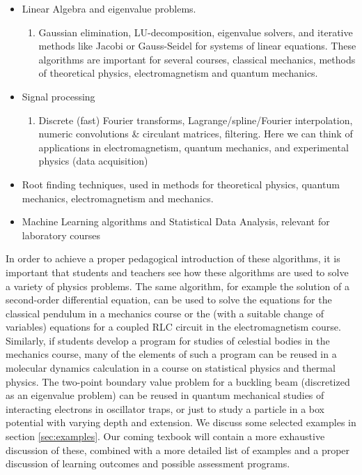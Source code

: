 \documentclass[graybox,envcountchap,sectrefs]{svmult}
\begin{document}
\begin{itemize}
\item Linear Algebra and eigenvalue problems.
\begin{enumerate}

  \item Gaussian elimination, LU-decomposition, eigenvalue solvers, and iterative methods like  Jacobi or Gauss-Seidel for systems of linear equations. These algorithms are important for several courses, classical mechanics, methods of theoretical physics, electromagnetism and quantum mechanics.

\end{enumerate}


\item Signal processing
\begin{enumerate}

  \item Discrete (fast) Fourier transforms, Lagrange/spline/Fourier interpolation, numeric convolutions {\&} circulant matrices, filtering. Here we can think of applications in electromagnetism, quantum mechanics, and experimental physics (data acquisition)

\end{enumerate}


\item Root finding techniques, used in methods for theoretical physics, quantum mechanics, electromagnetism and mechanics.

\item Machine Learning algorithms and Statistical Data Analysis, relevant for laboratory courses
\end{itemize}


In order to achieve a proper pedagogical introduction of these
algorithms, it is important that students and teachers see how these
algorithms are used to solve a variety of physics problems. The same
algorithm, for example the solution of a second-order differential
equation, can be used to solve the equations for the classical
pendulum in a mechanics course or the (with a suitable change of
variables) equations for a coupled RLC circuit in the electromagnetism
course. Similarly, if students develop a program for studies of
celestial bodies in the mechanics course, many of the elements of such
a program can be reused in a molecular dynamics calculation in a
course on statistical physics and thermal physics. The two-point
boundary value problem for a buckling beam (discretized as an
eigenvalue problem) can be reused in quantum mechanical studies of
interacting electrons in oscillator traps, or just to study a particle
in a box potential with varying depth and extension. We discuss some
selected examples in section \ref{sec:examples}. Our coming texbook
\cite{DannyMortenBook} will contain a more exhaustive discussion of these, combined with
a more detailed list of examples and a proper discussion of
learning outcomes and possible assessment programs.
\end{document}
